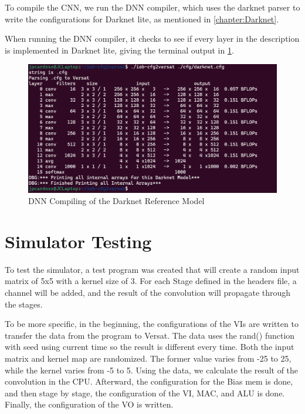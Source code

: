 To compile the CNN, we run the DNN compiler, which uses the darknet parser to write the configurations for Darknet lite, as mentioned in \ref{chapter:Darknet}.



When running the DNN compiler, it checks to see if every layer in the description is implemented in Darknet lite, giving the terminal output in \ref{figure:DNNcompiler}.

\begin{figure}[!htbp]
    \centering
    \includegraphics[width=\textwidth]{Figures/darknet1.png}
    \caption{DNN Compiling of the Darknet Reference Model}
    \label{figure:DNNcompiler}
\end{figure} 



\section{Simulator Testing}
\label{section:simtest}

To test the simulator, a test program was created that will create a random input matrix of 5x5
with a kernel size of 3. For each Stage defined in the headers file, a channel will be added, and the result of the convolution will propagate through the stages.

To be more specific, in the beginning, the configurations of the VIs are written to transfer the data
from the program to Versat. The data uses the rand() function with seed using current time
so the result is different every time. Both the input matrix and kernel map are randomized.
The former value varies from -25 to 25, while the kernel varies from -5 to 5. Using the data, 
we calculate the result of the convolution in the CPU. Afterward, the configuration for the Bias mem
is done, and then stage by stage, the configuration of the VI, MAC, and ALU is done. Finally, the
configuration of the VO is written.


